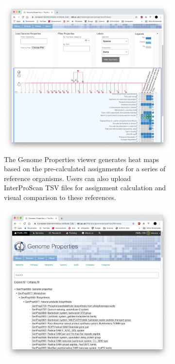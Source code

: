 \begin{figure}
     \centering
     \begin{subfigure}[b]{0.46\textwidth}
         \centering
         \includegraphics[width=\textwidth]{media/genome_properties_viewer.png}
         \caption{The Genome Properties viewer generates heat maps based on the pre-calculated assignments for a series of reference organisms. Users can also upload InterProScan TSV files for assignment calculation and visual comparison to these references.}
         \label{fig:property-viewer}
     \end{subfigure}
     \qquad %
     \begin{subfigure}[b]{0.46\textwidth}
         \centering
         \includegraphics[width=\textwidth]{media/genome_properties_browser.png}

\end{subfigure}
\end{figure}
